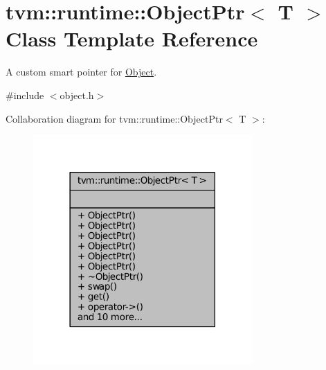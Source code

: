 \hypertarget{classtvm_1_1runtime_1_1ObjectPtr}{}\section{tvm\+:\+:runtime\+:\+:Object\+Ptr$<$ T $>$ Class Template Reference}
\label{classtvm_1_1runtime_1_1ObjectPtr}


A custom smart pointer for \hyperlink{classtvm_1_1runtime_1_1Object}{Object}.  




{\ttfamily \#include $<$object.\+h$>$}



Collaboration diagram for tvm\+:\+:runtime\+:\+:Object\+Ptr$<$ T $>$\+:
\nopagebreak
\begin{figure}[H]
\begin{center}
\leavevmode
\includegraphics[width=237pt]{classtvm_1_1runtime_1_1ObjectPtr__coll__graph}
\end{center}
\end{figure}
